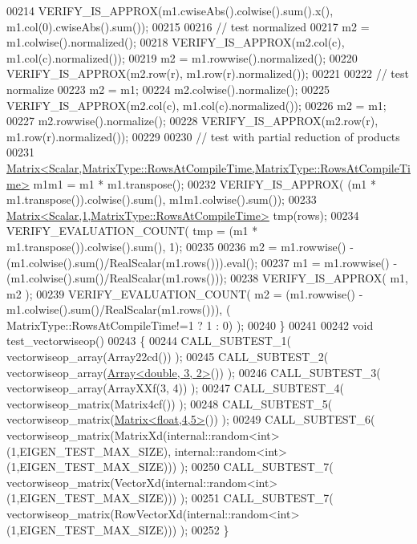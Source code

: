 \begin{DoxyCode}
00214   VERIFY\_IS\_APPROX(m1.cwiseAbs().colwise().sum().x(), m1.col(0).cwiseAbs().sum());
00215 
00216   \textcolor{comment}{// test normalized}
00217   m2 = m1.colwise().normalized();
00218   VERIFY\_IS\_APPROX(m2.col(c), m1.col(c).normalized());
00219   m2 = m1.rowwise().normalized();
00220   VERIFY\_IS\_APPROX(m2.row(r), m1.row(r).normalized());
00221 
00222   \textcolor{comment}{// test normalize}
00223   m2 = m1;
00224   m2.colwise().normalize();
00225   VERIFY\_IS\_APPROX(m2.col(c), m1.col(c).normalized());
00226   m2 = m1;
00227   m2.rowwise().normalize();
00228   VERIFY\_IS\_APPROX(m2.row(r), m1.row(r).normalized());
00229 
00230   \textcolor{comment}{// test with partial reduction of products}
00231   \hyperlink{group___core___module_class_eigen_1_1_matrix}{Matrix<Scalar,MatrixType::RowsAtCompileTime,MatrixType::RowsAtCompileTime>}
       m1m1 = m1 * m1.transpose();
00232   VERIFY\_IS\_APPROX( (m1 * m1.transpose()).colwise().sum(), m1m1.colwise().sum());
00233   \hyperlink{group___core___module_class_eigen_1_1_matrix}{Matrix<Scalar,1,MatrixType::RowsAtCompileTime>} tmp(rows);
00234   VERIFY\_EVALUATION\_COUNT( tmp = (m1 * m1.transpose()).colwise().sum(), 1);
00235 
00236   m2 = m1.rowwise() - (m1.colwise().sum()/RealScalar(m1.rows())).eval();
00237   m1 = m1.rowwise() - (m1.colwise().sum()/RealScalar(m1.rows()));
00238   VERIFY\_IS\_APPROX( m1, m2 );
00239   VERIFY\_EVALUATION\_COUNT( m2 = (m1.rowwise() - m1.colwise().sum()/RealScalar(m1.rows())), (
      MatrixType::RowsAtCompileTime!=1 ? 1 : 0) );
00240 \}
00241 
00242 \textcolor{keywordtype}{void} test\_vectorwiseop()
00243 \{
00244   CALL\_SUBTEST\_1( vectorwiseop\_array(Array22cd()) );
00245   CALL\_SUBTEST\_2( vectorwiseop\_array(\hyperlink{group___core___module_class_eigen_1_1_array}{Array<double, 3, 2>}()) );
00246   CALL\_SUBTEST\_3( vectorwiseop\_array(ArrayXXf(3, 4)) );
00247   CALL\_SUBTEST\_4( vectorwiseop\_matrix(Matrix4cf()) );
00248   CALL\_SUBTEST\_5( vectorwiseop\_matrix(\hyperlink{group___core___module_class_eigen_1_1_matrix}{Matrix<float,4,5>}()) );
00249   CALL\_SUBTEST\_6( vectorwiseop\_matrix(MatrixXd(internal::random<int>(1,EIGEN\_TEST\_MAX\_SIZE), 
      internal::random<int>(1,EIGEN\_TEST\_MAX\_SIZE))) );
00250   CALL\_SUBTEST\_7( vectorwiseop\_matrix(VectorXd(internal::random<int>(1,EIGEN\_TEST\_MAX\_SIZE))) );
00251   CALL\_SUBTEST\_7( vectorwiseop\_matrix(RowVectorXd(internal::random<int>(1,EIGEN\_TEST\_MAX\_SIZE))) );
00252 \}
\end{DoxyCode}
